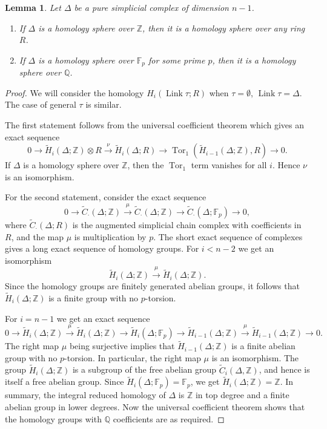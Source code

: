 \documentclass[10pt]{article}
\newtheorem{lemma}[theorem]{Lemma}
\theoremstyle{definition}
\newcommand{\FF}{{\mathbb{F}}}
\newcommand{\QQ}{{\mathbb{Q}}}
\newcommand{\ZZ}{{\mathbb{Z}}}
\newcommand{\Link}{\operatorname{Link}}
\newcommand{\Tor}{\operatorname{Tor}}
\newcommand{\tensor}{\otimes}
\begin{document}
\begin{lemma}
Let $\Delta$ be a pure simplicial complex of dimension $n-1$. 
\begin{enumerate}
\item If $\Delta$ is a homology sphere over $\ZZ$, then it is a homology sphere over any ring $R$.
\item If $\Delta$ is a homology sphere over $\FF_p$ for some prime $p$, then it is a homology sphere over $\QQ$.
\end{enumerate}
\end{lemma}

\begin{proof}
We will consider the homology $H_i(\Link\tau; R)$ when $\tau=\emptyset$, $\Link\tau=\Delta$. The case of general $\tau$ is similar.

The first statement follows from the universal coefficient theorem which gives an exact sequence
\[ 0\to \tilde{H}_i (\Delta; \ZZ) \tensor R \stackrel{\nu}{\to} \tilde{H}_i (\Delta; R) \to \Tor_1(\tilde{H}_{i-1} (\Delta; \ZZ), R) \to 0.\]
If $\Delta$ is a homology sphere over $\ZZ$, then the $\Tor_1$ term vanishes for all $i$. Hence $\nu$ is an isomorphism.

For the second statement, consider the exact sequence
\[  0\to \tilde{C}_\cdot(\Delta;\ZZ) \stackrel{\mu}{\to} \tilde{C}_\cdot(\Delta;\ZZ) \to \tilde{C}_\cdot(\Delta;\FF_p) \to 0,\]
where $\tilde{C}_\cdot(\Delta;R)$ is the augmented simplicial chain complex with coefficients in $R$, and the map $\mu$ is multiplication by $p$. The short exact sequence of complexes gives a long exact sequence of homology groups. For $i< n-2$ we get an isomorphism
\[ \tilde{H}_i(\Delta;\ZZ) \stackrel{\mu}{\to} \tilde{H}_i(\Delta;\ZZ).\]
Since the homology groups are finitely generated abelian groups, it follows that $\tilde{H}_i(\Delta;\ZZ)$ is a finite group with no $p$-torsion. 

For $i=n-1$ we get an exact sequence 
\[  0\to \tilde{H}_i(\Delta;\ZZ) \stackrel{\mu}{\to} \tilde{H}_i(\Delta;\ZZ) \to \tilde{H}_i(\Delta;\FF_p) \to \tilde{H}_{i-1}(\Delta;\ZZ) \stackrel{\mu}{\to} \tilde{H}_{i-1}(\Delta;\ZZ) \to 0.\]
The right map $\mu$ being surjective implies that $\tilde{H}_{i-1}(\Delta;\ZZ)$ is a finite abelian group with no $p$-torsion. In particular, the right map $\mu$ is an isomorphism. The group $\tilde{H}_i(\Delta;\ZZ)$ is a subgroup of the free abelian group $\tilde{C}_i(\Delta,\ZZ)$, and hence is itself a free abelian group. Since $\tilde{H}_i(\Delta;\FF_p) = \FF_p$, we get $\tilde{H}_i(\Delta;\ZZ) = \ZZ$.  In summary, the integral reduced homology of $\Delta$ is $\ZZ$ in top degree and a finite abelian group in lower degrees. Now the universal coefficient theorem shows that the  homology groups with $\QQ$ coefficients are as required.
\end{proof}
\end{document}
